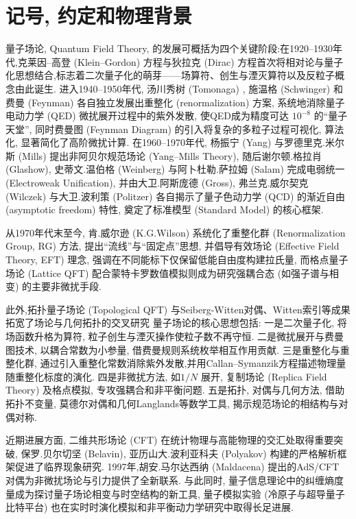 \chapter{记号, 约定和物理背景}
\label{CH1: Notation convention and physical background}
量子场论, Quantum Field Theory, 的发展可概括为四个关键阶段:在1920--1930年代,克莱因--高登 (Klein--Gordon) 方程与狄拉克 (Dirac) 方程首次将相对论与量子化思想结合,标志着二次量子化的萌芽——场算符、创生与湮灭算符以及反粒子概念由此诞生.
进入1940--1950年代, 汤川秀树 (Tomonaga) , 施温格 (Schwinger) 和费曼 (Feynman) 各自独立发展出重整化 (renormalization) 方案, 系统地消除量子电动力学 (QED) 微扰展开过程中的紫外发散, 使QED成为精度可达 $10^{-8}$ 的``量子天堂”, 同时费曼图 (Feynman Diagram) 的引入将复杂的多粒子过程可视化, 算法化, 显著简化了高阶微扰计算.
在1960--1970年代, 杨振宁 (Yang) 与罗德里克.米尔斯 (Mills) 提出非阿贝尔规范场论 (Yang--Mills Theory), 随后谢尔顿.格拉肖 (Glashow), 史蒂文.温伯格 (Weinberg) 与阿卜杜勒.萨拉姆 (Salam) 完成电弱统一 (Electroweak Unification), 并由大卫.阿斯庞德 (Gross), 弗兰克.威尔契克 (Wilczek) 与大卫.波利策 (Politzer) 各自揭示了量子色动力学 (QCD) 的渐近自由 (asymptotic freedom) 特性, 奠定了标准模型 (Standard Model) 的核心框架.


从1970年代末至今, 肯.威尔逊 (K.G.Wilson) 系统化了重整化群 (Renormalization Group, RG) 方法, 提出``流线”与``固定点”思想, 并倡导有效场论 (Effective Field Theory, EFT) 理念, 强调在不同能标下仅保留低能自由度构建拉氏量, 而格点量子场论 (Lattice QFT) 配合蒙特卡罗数值模拟则成为研究强耦合态 (如强子谱与相变) 的主要非微扰手段.


此外,拓扑量子场论 (Topological QFT) 与Seiberg-Witten对偶、Witten索引等成果拓宽了场论与几何拓扑的交叉研究
量子场论的核心思想包括: 一是二次量子化, 将场函数升格为算符, 粒子创生与湮灭操作使粒子数不再守恒.
二是微扰展开与费曼图技术, 以耦合常数为小参量, 借费曼规则系统枚举相互作用贡献.
三是重整化与重整化群, 通过引入重整化常数消除紫外发散,并用Callan--Symanzik方程描述物理量随重整化标度的演化.
四是非微扰方法, 如$1/N$ 展开, 复制场论 (Replica Field Theory) 及格点模拟, 专攻强耦合和非平衡问题.
五是拓扑, 对偶与几何方法, 借助拓扑不变量, 莫德尔对偶和几何Langlands等数学工具, 揭示规范场论的相结构与对偶对称.


近期进展方面, 二维共形场论 (CFT) 在统计物理与高能物理的交汇处取得重要突破, 保罗.贝尔切坚 (Belavin), 亚历山大.波利亚科夫 (Polyakov) 构建的严格解析框架促进了临界现象研究.
1997年,胡安.马尔达西纳 (Maldacena) 提出的AdS/CFT 对偶为非微扰场论与引力提供了全新联系.
与此同时, 量子信息理论中的纠缠熵度量成为探讨量子场论相变与时空结构的新工具, 量子模拟实验 (冷原子与超导量子比特平台) 也在实时时演化模拟和非平衡动力学研究中取得长足进展.



